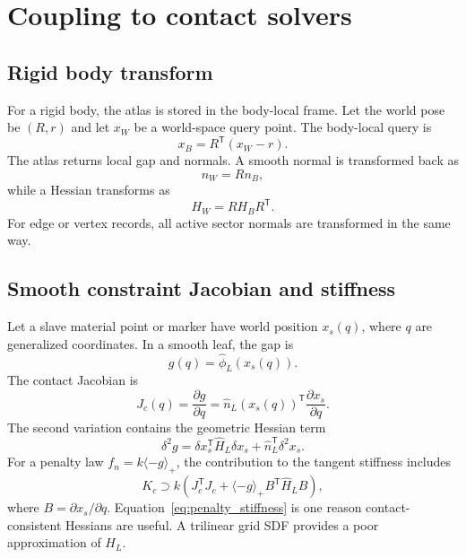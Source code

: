 \documentclass[preprint,12pt,sort&compress]{elsarticle}
\newcommand{\T}{\mathsf{T}}
\begin{document}
\section{Coupling to contact solvers}
\label{sec:solver}

\subsection{Rigid body transform}

For a rigid body, the atlas is stored in the body-local frame. Let the world pose be $(R,r)$ and let $x_W$ be a world-space query point. The body-local query is
\begin{equation}
 x_B = R^\T(x_W-r).
\end{equation}
The atlas returns local gap and normals. A smooth normal is transformed back as
\begin{equation}
 n_W=R n_B,
\end{equation}
while a Hessian transforms as
\begin{equation}
 H_W=R H_B R^\T.
\end{equation}
For edge or vertex records, all active sector normals are transformed in the same way.

\subsection{Smooth constraint Jacobian and stiffness}

Let a slave material point or marker have world position $x_s(q)$, where $q$ are generalized coordinates. In a smooth leaf, the gap is
\begin{equation}
 g(q)=\widehat\phi_L(x_s(q)).
\end{equation}
The contact Jacobian is
\begin{equation}
 J_c(q)=\frac{\partial g}{\partial q}=\widehat n_L(x_s(q))^\T \frac{\partial x_s}{\partial q}.
\label{eq:jacobian_smooth}
\end{equation}
The second variation contains the geometric Hessian term
\begin{equation}
 \delta^2 g = \delta x_s^\T \widehat H_L \delta x_s + \widehat n_L^\T \delta^2 x_s.
\label{eq:gap_second_variation}
\end{equation}
For a penalty law $f_n=k\langle -g\rangle_+$, the contribution to the tangent stiffness includes
\begin{equation}
 K_c \supset k\left( J_c^\T J_c + \langle -g\rangle_+ B^\T \widehat H_L B\right),
\label{eq:penalty_stiffness}
\end{equation}
where $B=\partial x_s/\partial q$. Equation~\eqref{eq:penalty_stiffness} is one reason contact-consistent Hessians are useful. A trilinear grid SDF provides a poor approximation of $H_L$.
\end{document}
